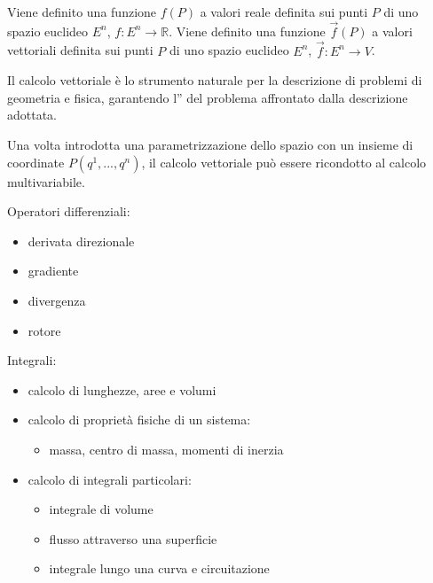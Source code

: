 \documentclass[letterpaper,10pt,italian]{jupyterBook}
\begin{document}
\sphinxAtStartPar
Viene definito  una funzione \(f(P)\) a valori reale definita sui punti \(P\) di uno spazio euclideo \(E^n\), \(f: E^n \rightarrow \mathbb{R}\).
Viene definito  una funzione \(\vec{f}(P)\) a valori vettoriali definita sui punti \(P\) di uno spazio euclideo \(E^n\), \(\vec{f}: E^n \rightarrow V\).
 

\sphinxAtStartPar
Il calcolo vettoriale è lo strumento naturale per la descrizione di problemi di geometria e fisica, garantendo l” del problema affrontato dalla descrizione adottata. 

\sphinxAtStartPar
Una volta introdotta una parametrizzazione dello spazio con un insieme di coordinate \(P(q^1,...,q^n)\), il calcolo vettoriale può essere ricondotto al calcolo multi\sphinxhyphen{}variabile.

\sphinxAtStartPar
{} 

\sphinxAtStartPar
Operatori differenziali:
\begin{itemize}
\item {} 
\sphinxAtStartPar
derivata direzionale

\item {} 
\sphinxAtStartPar
gradiente

\item {} 
\sphinxAtStartPar
divergenza

\item {} 
\sphinxAtStartPar
rotore

\end{itemize}

\sphinxAtStartPar
Integrali:
\begin{itemize}
\item {} 
\sphinxAtStartPar
calcolo di lunghezze, aree e volumi

\item {} 
\sphinxAtStartPar
calcolo di proprietà fisiche di un sistema:
\begin{itemize}
\item {} 
\sphinxAtStartPar
massa, centro di massa, momenti di inerzia

\end{itemize}

\item {} 
\sphinxAtStartPar
calcolo di integrali particolari:
\begin{itemize}
\item {} 
\sphinxAtStartPar
integrale di volume

\item {} 
\sphinxAtStartPar
flusso attraverso una superficie

\item {} 
\sphinxAtStartPar
integrale lungo una curva e circuitazione

\end{itemize}

\end{itemize}
\end{document}
